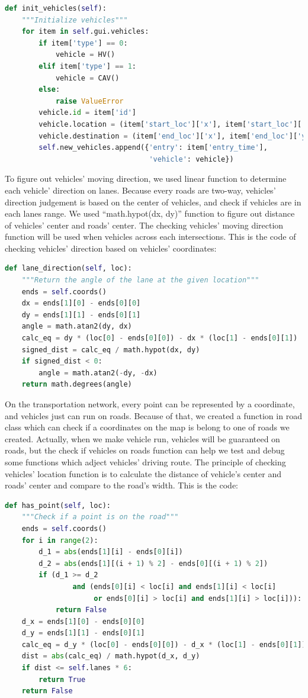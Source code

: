 \documentclass[onecolumn, draftclsnofoot,10pt, compsoc]{IEEEtran}
\begin{document}
\begin{lstlisting}[language=Python]
def init_vehicles(self):
    """Initialize vehicles"""
    for item in self.gui.vehicles:
        if item['type'] == 0:
            vehicle = HV()
        elif item['type'] == 1:
            vehicle = CAV()
        else:
            raise ValueError
        vehicle.id = item['id']
        vehicle.location = (item['start_loc']['x'], item['start_loc']['y'])
        vehicle.destination = (item['end_loc']['x'], item['end_loc']['y'])
        self.new_vehicles.append({'entry': item['entry_time'],
                                  'vehicle': vehicle})
\end{lstlisting}
To figure out vehicles’ moving direction, we used linear function to determine each vehicle’ direction on lanes. Because every roads are two-way, vehicles’ direction judgement is based on the center of vehicles, and check if vehicles are in each lanes range. We used “math.hypot(dx, dy)” function to figure out distance of vehicles’ center and roads’ center. The checking vehicles’ moving direction function will be used when vehicles across each intersections. This is the code of checking vehicles’ direction based on vehicles’ coordinates:
\begin{lstlisting}[language=Python]
def lane_direction(self, loc):
    """Return the angle of the lane at the given location"""
    ends = self.coords()
    dx = ends[1][0] - ends[0][0]
    dy = ends[1][1] - ends[0][1]
    angle = math.atan2(dy, dx)
    calc_eq = dy * (loc[0] - ends[0][0]) - dx * (loc[1] - ends[0][1])
    signed_dist = calc_eq / math.hypot(dx, dy)
    if signed_dist < 0:
        angle = math.atan2(-dy, -dx)
    return math.degrees(angle)
\end{lstlisting}
On the transportation network, every point can be represented by a coordinate, and vehicles just can run on roads. Because of that, we created a function in road class which can check if a coordinates on the map is belong to one of roads we created. Actually, when we make vehicle run, vehicles will be guaranteed on roads, but the check if vehicles on roads function can help we test and debug some functions which adject vehicles’ driving route. The principle of checking vehicles’ location function is to calculate the distance of vehicle’s center and roads’ center and compare to the road’s width. This is the code:
\begin{lstlisting}[language=Python]
def has_point(self, loc):
    """Check if a point is on the road"""
    ends = self.coords()
    for i in range(2):
        d_1 = abs(ends[1][i] - ends[0][i])
        d_2 = abs(ends[1][(i + 1) % 2] - ends[0][(i + 1) % 2])
        if (d_1 >= d_2
                and (ends[0][i] < loc[i] and ends[1][i] < loc[i]
                     or ends[0][i] > loc[i] and ends[1][i] > loc[i])):
            return False
    d_x = ends[1][0] - ends[0][0]
    d_y = ends[1][1] - ends[0][1]
    calc_eq = d_y * (loc[0] - ends[0][0]) - d_x * (loc[1] - ends[0][1])
    dist = abs(calc_eq) / math.hypot(d_x, d_y)
    if dist <= self.lanes * 6:
        return True
    return False
\end{lstlisting}
\end{document}
